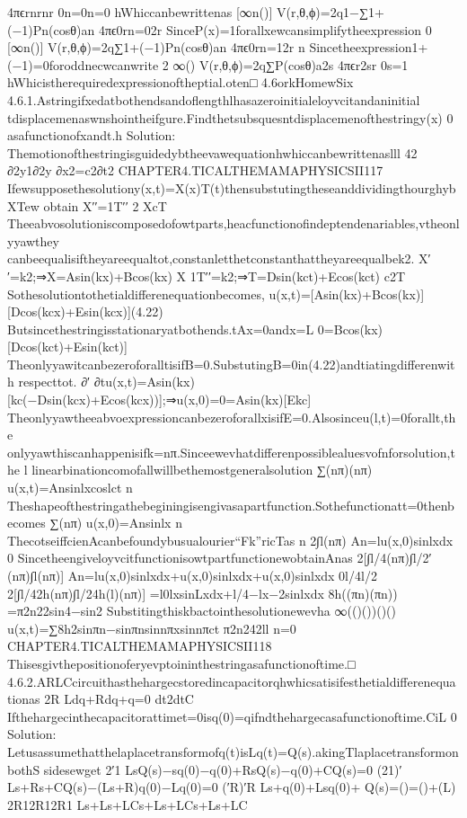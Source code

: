 {{{{{{4πϵrnrnr
0n=0n=0
hWhiccanbewrittenas
[∞n()]
V(r,θ,ϕ)=2q1−∑1+(−1)Pn(cosθ)an
4πϵ0rn=02r
SinceP(x)=1forallxewcansimplifytheexpression
0
[∞n()]
V(r,θ,ϕ)=2q∑1+(−1)Pn(cosθ)an
4πϵ0rn=12r
n
Sincetheexpression1+(−1)=0foroddnecwcanwrite
2
∞()
V(r,θ,ϕ)=2q∑P(cosθ)a2s
4πϵr2sr
0s=1
hWhicistherequiredexpressionoftheptial.oten□
4.6orkHomewSix
4.6.1.Astringifxedatbothendsandoflengthlhasazeroinitialeloyvcitandaninitial
tdisplacemenaswnshointheifgure.Findthetsubsquesntdisplacemenofthestringy(x)
0
asafunctionofxandt.h
Solution:
Themotionofthestringisguidedybtheevawequationhwhiccanbewrittenaslll
42
∂2y1∂2y
∂x2=c2∂t2
CHAPTER4.TICALTHEMAMAPHYSICSII117
Ifewsupposethesolutiony(x,t)=X(x)T(t)thensubstutingtheseanddividingthourghybXTew
obtain
X′′=1T′′
2
XcT
Theeabvosolutioniscomposedofowtparts,heacfunctionofindeptendenariables,vtheonlyyawthey
canbeequalisiftheyareequaltot,constanletthetconstanthattheyareequalbek2.
X′′=k2;⇒X=Asin(kx)+Bcos(kx)
X
1T′′=k2;⇒T=Dsin(kct)+Ecos(kct)
c2T
Sothesolutiontothetialdifferenequationbecomes,
u(x,t)=[Asin(kx)+Bcos(kx)][Dcos(kcx)+Esin(kcx)](4.22)
Butsincethestringisstationaryatbothends.tAx=0andx=L
0=Bcos(kx)[Dcos(kct)+Esin(kct)]
TheonlyyawitcanbezeroforalltisifB=0.SubstutingB=0in(4.22)andtiatingdifferenwith
respecttot.
∂′
∂tu(x,t)=Asin(kx)[kc(−Dsin(kcx)+Ecos(kcx))];⇒u(x,0)=0=Asin(kx)[Ekc]
TheonlyyawtheeabvoexpressioncanbezeroforallxisifE=0.Alsosinceu(l,t)=0forallt,the
onlyyawthiscanhappenisifk=nπ.Sinceewevhatdifferenpossiblealuesvofnforsolution,the
l
linearbinationcomofallwillbethemostgeneralsolution
∑(nπ)(nπ)
u(x,t)=Ansinlxcoslct
n
Theshapeofthestringathebeginingisengivasapartfunction.Sothefunctionatt=0thenbecomes
∑(nπ)
u(x,0)=Ansinlx
n
ThecotseiffcienAcanbefoundybusualourier“Fk”ricTas
n
2∫l(nπ)
An=lu(x,0)sinlxdx
0
SincetheengiveloyvcitfunctionisowtpartfunctionewobtainAnas
2[∫l/4(nπ)∫l/2′(nπ)∫l(nπ)]
An=lu(x,0)sinlxdx+u(x,0)sinlxdx+u(x,0)sinlxdx
0l/4l/2
2[∫l/42h(nπ)∫l/24h(l)(nπ)]
=l0lxsinLxdx+l/4−lx−2sinlxdx
8h((πn)(πn))
=π2n22sin4−sin2
Substitingthiskbactointhesolutionewevha
∞(()())()()
u(x,t)=∑8h2sinπn−sinπnsinnπxsinnπct
π2n242ll
n=0
CHAPTER4.TICALTHEMAMAPHYSICSII118
Thisesgivthepositionoferyevptoininthestringasafunctionoftime.□
4.6.2.ARLCcircuithasthehargecstoredincapacitorqhwhicsatisifesthetialdifferenequationas
2R
Ldq+Rdq+q=0
dt2dtC
Ifthehargecinthecapacitorattimet=0isq(0)=qifndthehargecasafunctionoftime.CiL
0
Solution:
Letusassumethatthelaplacetransformofq(t)isL{q(t)}=Q(s).akingTlaplacetransformonbothS
sidesewget
{2′}1
LsQ(s)−sq(0)−q(0)+R{sQ(s)−q(0)}+CQ(s)=0
(21)′
Ls+Rs+CQ(s)−(Ls+R)q(0)−Lq(0)=0
(′R)′R
Ls+q(0)+Lsq(0)+
Q(s)=()=()+(L)
2R12R12R1
Ls+Ls+LCs+Ls+LCs+Ls+LC
}}}}}}
